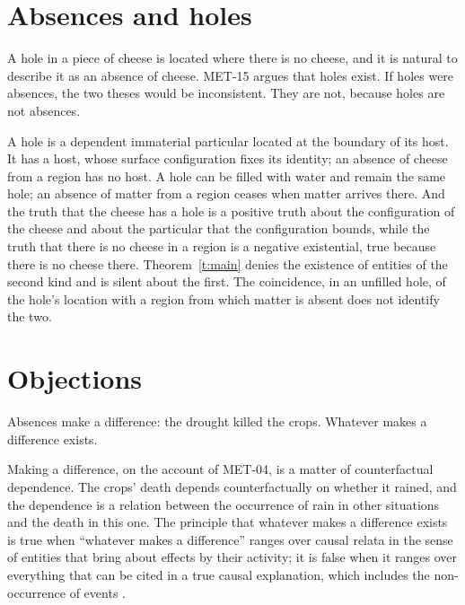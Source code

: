 \documentclass{situationist-preprint}
\begin{document}
\section{Absences and holes}

A hole in a piece of cheese is located where there is no cheese, and it is natural to describe it as an absence of cheese. MET-15 argues that holes exist. If holes were absences, the two theses would be inconsistent. They are not, because holes are not absences.

A hole is a dependent immaterial particular located at the boundary of its host. It has a host, whose surface configuration fixes its identity; an absence of cheese from a region has no host. A hole can be filled with water and remain the same hole; an absence of matter from a region ceases when matter arrives there. And the truth that the cheese has a hole is a positive truth about the configuration of the cheese and about the particular that the configuration bounds, while the truth that there is no cheese in a region is a negative existential, true because there is no cheese there. Theorem~\ref{t:main} denies the existence of entities of the second kind and is silent about the first. The coincidence, in an unfilled hole, of the hole's location with a region from which matter is absent does not identify the two.

\section{Objections}

\begin{objection}
Absences make a difference: the drought killed the crops. Whatever makes a difference exists.
\end{objection}

\begin{reply}
Making a difference, on the account of MET-04, is a matter of counterfactual dependence. The crops' death depends counterfactually on whether it rained, and the dependence is a relation between the occurrence of rain in other situations and the death in this one. The principle that whatever makes a difference exists is true when \enquote{whatever makes a difference} ranges over causal relata in the sense of entities that bring about effects by their activity; it is false when it ranges over everything that can be cited in a true causal explanation, which includes the non-occurrence of events \citep{Beebee2004}.
\end{reply}
\end{document}
